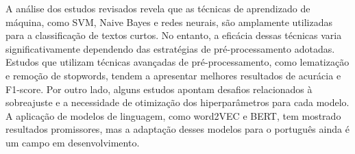A análise dos estudos revisados revela que as técnicas de aprendizado de máquina, como SVM, Naive Bayes e redes neurais, são amplamente utilizadas para a classificação de textos curtos. No entanto, a eficácia dessas técnicas varia significativamente dependendo das estratégias de pré-processamento adotadas. Estudos que utilizam técnicas avançadas de pré-processamento, como lematização e remoção de stopwords, tendem a apresentar melhores resultados de acurácia e F1-score. Por outro lado, alguns estudos apontam desafios relacionados à sobreajuste e a necessidade de otimização dos hiperparâmetros para cada modelo. A aplicação de modelos de linguagem, como word2VEC e BERT, tem mostrado resultados promissores, mas a adaptação desses modelos para o português ainda é um campo em desenvolvimento.









